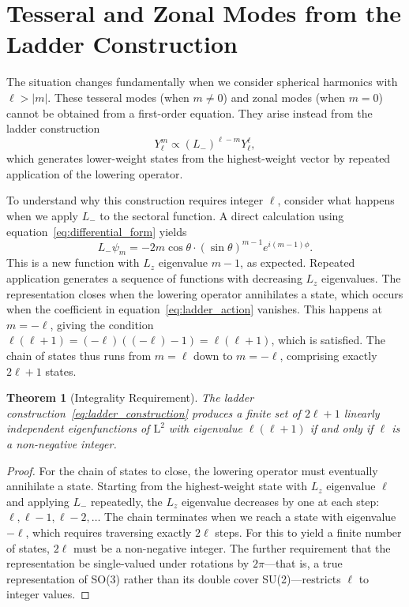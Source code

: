 \documentclass[
  aip,
  amsmath,amssymb,
  preprint
]{revtex4-1}
\newtheorem{theorem}{Theorem}[section]
\begin{document}
\section{Tesseral and Zonal Modes from the Ladder Construction}
The situation changes fundamentally when we consider spherical harmonics with $\ell > |m|$. These tesseral modes (when $m \neq 0$) and zonal modes (when $m = 0$) cannot be obtained from a first-order equation. They arise instead from the ladder construction
\begin{equation}
Y_\ell^m \propto (L_-)^{\ell - m} Y_\ell^\ell,
\label{eq:ladder_construction}
\end{equation}
which generates lower-weight states from the highest-weight vector by repeated application of the lowering operator.

To understand why this construction requires integer $\ell$, consider what happens when we apply $L_-$ to the sectoral function. A direct calculation using equation~\eqref{eq:differential_form} yields
\begin{equation}
L_- \psi_m = -2m\cos\theta \cdot (\sin\theta)^{m-1} e^{i(m-1)\phi}.
\label{eq:lowering_sectoral}
\end{equation}
This is a new function with $L_z$ eigenvalue $m-1$, as expected. Repeated application generates a sequence of functions with decreasing $L_z$ eigenvalues. The representation closes when the lowering operator annihilates a state, which occurs when the coefficient in equation~\eqref{eq:ladder_action} vanishes. This happens at $m = -\ell$, giving the condition $\ell(\ell+1) = (-\ell)((-\ell)-1) = \ell(\ell+1)$, which is satisfied. The chain of states thus runs from $m = \ell$ down to $m = -\ell$, comprising exactly $2\ell + 1$ states.

\begin{theorem}[Integrality Requirement]
\label{thm:integrality}
The ladder construction~\eqref{eq:ladder_construction} produces a finite set of $2\ell + 1$ linearly independent eigenfunctions of $\mathrm{L}^2$ with eigenvalue $\ell(\ell+1)$ if and only if $\ell$ is a non-negative integer.
\end{theorem}

\begin{proof}
For the chain of states to close, the lowering operator must eventually annihilate a state. Starting from the highest-weight state with $L_z$ eigenvalue $\ell$ and applying $L_-$ repeatedly, the $L_z$ eigenvalue decreases by one at each step: $\ell, \ell-1, \ell-2, \ldots$ The chain terminates when we reach a state with eigenvalue $-\ell$, which requires traversing exactly $2\ell$ steps. For this to yield a finite number of states, $2\ell$ must be a non-negative integer. The further requirement that the representation be single-valued under rotations by $2\pi$---that is, a true representation of SO(3) rather than its double cover SU(2)---restricts $\ell$ to integer values.
\end{proof}
\end{document}
